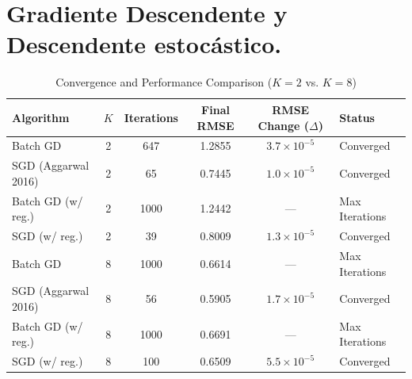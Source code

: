 \section{Gradiente Descendente y Descendente estocástico.}

\begin{table}[htbp]
\centering
\small
\caption{Convergence and Performance Comparison (\(K=2\) vs. \(K=8\))}
\label{tab:convergence_summary_k_comparison}
\begin{tabular}{l c c S[table-format=1.4] c l}
\toprule
\textbf{Algorithm} & \(K\) & \textbf{Iterations} & {\textbf{Final RMSE}} & \textbf{RMSE Change (\(\Delta\))} & \textbf{Status} \\
\midrule
Batch GD                        & 2 & 647  & 1.2855 & \(3.7 \times 10^{-5}\) & Converged \\
SGD (Aggarwal 2016)             & 2 & 65   & 0.7445 & \(1.0 \times 10^{-5}\) & Converged \\
Batch GD (w/ reg.)              & 2 & 1000 & 1.2442 & {---}                & Max Iterations \\
SGD (w/ reg.)                   & 2 & 39   & 0.8009 & \(1.3 \times 10^{-5}\) & Converged \\
\midrule
Batch GD                        & 8 & 1000 & 0.6614 & {---}                & Max Iterations \\
SGD (Aggarwal 2016)             & 8 & 56   & 0.5905 & \(1.7 \times 10^{-5}\) & Converged \\
Batch GD (w/ reg.)              & 8 & 1000 & 0.6691 & {---}                & Max Iterations \\
SGD (w/ reg.)                   & 8 & 100  & 0.6509 & \(5.5 \times 10^{-5}\) & Converged \\
\bottomrule
\end{tabular}
\end{table}

\begingroup
\footnotesize
\setlength{\tabcolsep}{3.5pt}

